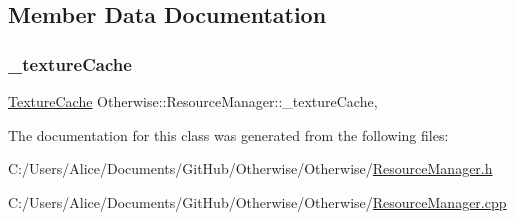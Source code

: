 \subsection{Member Data Documentation}
\mbox{\label{class_otherwise_1_1_resource_manager_a7fb7f4f144620d1e26228662b30530f4}} 
\subsubsection{\texorpdfstring{\+\_\+texture\+Cache}{\_textureCache}}
{\footnotesize\ttfamily \hyperlink{class_otherwise_1_1_texture_cache}{Texture\+Cache} Otherwise\+::\+Resource\+Manager\+::\+\_\+texture\+Cache\hspace{0.3cm}{\ttfamily [static]}, {\ttfamily [private]}}



The documentation for this class was generated from the following files\+:\begin{DoxyCompactItemize}
\item 
C\+:/\+Users/\+Alice/\+Documents/\+Git\+Hub/\+Otherwise/\+Otherwise/\hyperlink{_resource_manager_8h}{Resource\+Manager.\+h}\item 
C\+:/\+Users/\+Alice/\+Documents/\+Git\+Hub/\+Otherwise/\+Otherwise/\hyperlink{_resource_manager_8cpp}{Resource\+Manager.\+cpp}\end{DoxyCompactItemize}

